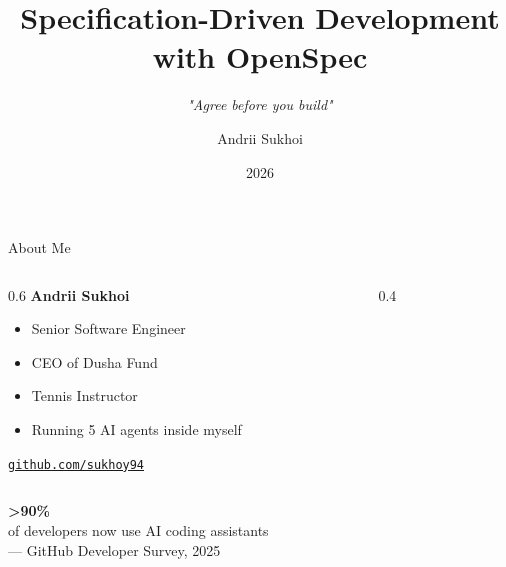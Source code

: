 \documentclass[aspectratio=169,18pt]{beamer}
\title{\textbf{Specification-Driven Development\\with OpenSpec}}
\subtitle{\textit{"Agree before you build"}}
\author{Andrii Sukhoi}
\institute{Lubelski Klub IT}
\date{2026}
\begin{document}
\maketitle


\begin{frame}{About Me}
  \vspace{0.5em}
  \begin{columns}[T]
    \begin{column}{0.6\textwidth}
      \Large
      \textbf{Andrii Sukhoi}\\[1em]
      \normalsize
      \begin{itemize}\setlength\itemsep{0.6em}
        \item Senior Software Engineer
        \item CEO of Dusha Fund
        \item Tennis Instructor
        \item Running 5 AI agents inside myself
      \end{itemize}
      \vspace{1em}
      \texttt{\href{https://github.com/sukhoy94}{\color{openblue}github.com/sukhoy94}}
    \end{column}
    \begin{column}{0.4\textwidth}
      \vspace{1em}
    \end{column}
  \end{columns}
\end{frame}

\begin{frame}{}
  \vspace{2em}
  \begin{center}
    {\fontsize{72}{80}\selectfont\textbf{\color{openblue}>90\%}}\\[0.5em]
    \Large of developers now use AI coding assistants\\[1em]
    \normalsize\color{opengray}— GitHub Developer Survey, 2025
  \end{center}
\end{frame}
\end{document}
